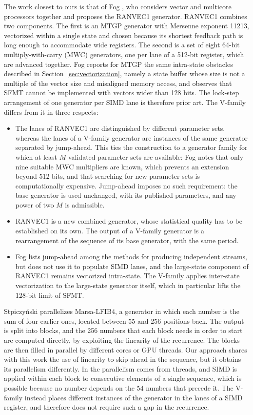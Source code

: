 \documentclass[preprint,1p,times]{elsarticle}
\begin{document}
The work closest to ours is that of Fog \cite{fog}, who considers vector and multicore processors together and proposes the RANVEC1 generator. RANVEC1 combines two components. The first is an MTGP generator with Mersenne exponent 11213, vectorized within a single state and chosen because its shortest feedback path is long enough to accommodate wide registers. The second is a set of eight 64-bit multiply-with-carry (MWC) generators, one per lane of a 512-bit register, which are advanced together. Fog reports for MTGP the same intra-state obstacles described in Section~\ref{sec:vectorization}, namely a state buffer whose size is not a multiple of the vector size and misaligned memory access, and observes that SFMT cannot be implemented with vectors wider than 128 bits. The lock-step arrangement of one generator per SIMD lane is therefore prior art. The V-family differs from it in three respects:
\begin{itemize}
    \item The lanes of RANVEC1 are distinguished by different parameter sets, whereas the lanes of a V-family generator are instances of the same generator separated by jump-ahead. This ties the construction to a generator family for which at least $M$ validated parameter sets are available: Fog notes that only nine suitable MWC multipliers are known, which prevents an extension beyond 512 bits, and that searching for new parameter sets is computationally expensive. Jump-ahead imposes no such requirement: the base generator is used unchanged, with its published parameters, and any power of two $M$ is admissible.
    \item RANVEC1 is a new combined generator, whose statistical quality has to be established on its own. The output of a V-family generator is a rearrangement of the sequence of its base generator, with the same period.
    \item Fog lists jump-ahead among the methods for producing independent streams, but does not use it to populate SIMD lanes, and the large-state component of RANVEC1 remains vectorized intra-state. The V-family applies inter-state vectorization to the large-state generator itself, which in particular lifts the 128-bit limit of SFMT.
\end{itemize}

Stpiczy\'nski \cite{stpiczynski} parallelizes Marsa-LFIB4, a generator in which each number is the sum of four earlier ones, located between 55 and 256 positions back. The output is split into blocks, and the 256 numbers that each block needs in order to start are computed directly, by exploiting the linearity of the recurrence. The blocks are then filled in parallel by different cores or GPU threads. Our approach shares with this work the use of linearity to skip ahead in the sequence, but it obtains its parallelism differently. In \cite{stpiczynski} the parallelism comes from threads, and SIMD is applied within each block to consecutive elements of a single sequence, which is possible because no number depends on the 54 numbers that precede it. The V-family instead places different instances of the generator in the lanes of a SIMD register, and therefore does not require such a gap in the recurrence.
\end{document}
